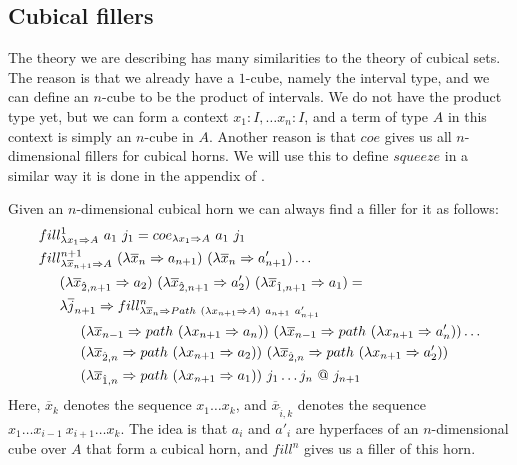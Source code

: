 \documentclass{amsart}
\theoremstyle{definition}
\theoremstyle{remark}
\newcommand{\red}{\Rightarrow}
\numberwithin{figure}{section}
\begin{document}
\subsection{Cubical fillers}

The theory we are describing has many similarities to the theory of cubical sets.
The reason is that we already have a $1$-cube, namely the interval type, and we can define an $n$-cube to be the product of intervals.
We do not have the product type yet, but we can form a context $x_1 : I, \ldots x_n : I$, and a term of type $A$ in this context is simply an $n$-cube in $A$.
Another reason is that $coe$ gives us all $n$-dimensional fillers for cubical horns.
We will use this to define $squeeze$ in a similar way it is done in the appendix of \cite{cubical}.

Given an $n$-dimensional cubical horn we can always find a filler for it as follows:
\begin{align*}
& fill^1_{\lambda x_1 \red A}\ a_1\ j_1 = coe_{\lambda x_1 \red A}\ a_1\ j_1 \\
& fill^{n+1}_{\lambda \overline{x}_{n+1} \red A}\ (\lambda \overline{x}_n \red a_{n+1})\ (\lambda \overline{x}_n \red a'_{n+1}) \ldots \\
& \indent (\lambda \overline{x}_{\hat{2},n+1} \red a_2)\ (\lambda \overline{x}_{\hat{2},n+1} \red a'_2)\ (\lambda \overline{x}_{\hat{1},n+1} \red a_1) = \\
& \indent \lambda \overline{j}_{n+1} \red fill^n_{\lambda \overline{x}_n \red Path\ (\lambda x_{n+1} \red A)\ a_{n+1}\ a'_{n+1}} \\
& \indent \indent (\lambda \overline{x}_{n-1} \red path\ (\lambda x_{n+1} \red a_n))\ (\lambda \overline{x}_{n-1} \red path\ (\lambda x_{n+1} \red a'_n)) \ldots \\
& \indent \indent (\lambda \overline{x}_{\hat{2},n} \red path\ (\lambda x_{n+1} \red a_2))\ (\lambda \overline{x}_{\hat{2},n} \red path\ (\lambda x_{n+1} \red a'_2)) \\
& \indent \indent (\lambda \overline{x}_{\hat{1},n} \red path\ (\lambda x_{n+1} \red a_1))\ j_1 \ldots j_n\ @\ j_{n+1}
\end{align*}
Here, $\overline{x}_k$ denotes the sequence $x_1 \ldots x_k$, and $\overline{x}_{\hat{i},k}$ denotes the sequence $x_1 \ldots x_{i-1}\ x_{i+1} \ldots x_k$.
The idea is that $a_i$ and $a'_i$ are hyperfaces of an $n$-dimensional cube over $A$ that form a cubical horn, and $fill^n$ gives us a filler of this horn.
\end{document}
